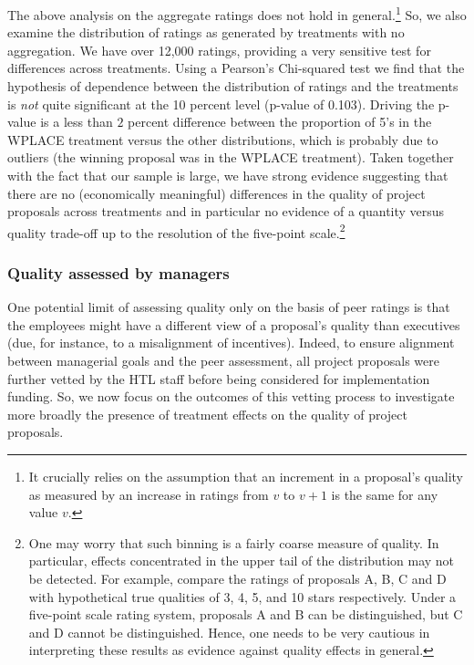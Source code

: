 \documentclass[12pt, titlepage]{article}
\begin{document}
The above analysis on the aggregate ratings does not hold in
general.\footnote{It crucially relies on the assumption that an
  increment in a proposal's quality as measured by an increase in
  ratings from \(v\) to \(v+1\) is the same for any value \(v\).} So, we
also examine the distribution of ratings as generated by treatments with
no aggregation. We have over 12,000 ratings, providing a very sensitive
test for differences across treatments. Using a Pearson's Chi-squared
test we find that the hypothesis of dependence between the distribution
of ratings and the treatments is \emph{not} quite significant at the 10
percent level (p-value of 0.103). Driving the p-value is a less than
\(2\) percent difference between the proportion of 5's in the WPLACE
treatment versus the other distributions, which is probably due to
outliers (the winning proposal was in the WPLACE treatment). Taken
together with the fact that our sample is large, we have strong evidence
suggesting that there are no (economically meaningful) differences in
the quality of project proposals across treatments and in particular no
evidence of a quantity versus quality trade-off up to the resolution of
the five-point scale.\footnote{One may worry that such binning is a
  fairly coarse measure of quality. In particular, effects concentrated
  in the upper tail of the distribution may not be detected. For
  example, compare the ratings of proposals A, B, C and D with
  hypothetical true qualities of 3, 4, 5, and 10 stars respectively.
  Under a five-point scale rating system, proposals A and B can be
  distinguished, but C and D cannot be distinguished. Hence, one needs
  to be very cautious in interpreting these results as evidence against
  quality effects in general.}

\subsubsection{Quality assessed by
managers}\label{quality-assessed-by-managers}

One potential limit of assessing quality only on the basis of peer
ratings is that the employees might have a different view of a
proposal's quality than executives (due, for instance, to a misalignment
of incentives). Indeed, to ensure alignment between managerial goals and
the peer assessment, all project proposals were further vetted by the
HTL staff before being considered for implementation funding. So, we now
focus on the outcomes of this vetting process to investigate more
broadly the presence of treatment effects on the quality of project
proposals.
\end{document}
